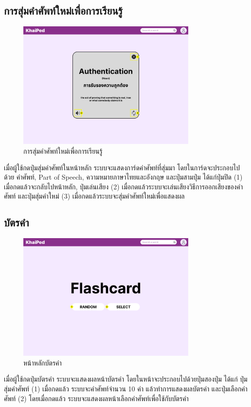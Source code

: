 \documentclass[12pt,oneside,openright,a4paper]{cpe-thai-project}
\begin{document}
\pagebreak
\subsection{การสุ่มคำศัพท์ใหม่เพื่อการเรียนรู้}
\begin{figure}[!h]\centering
	\includegraphics[width=0.8\textwidth, keepaspectratio=true]{image/chap3/ui/Random Word.png}
	\caption{การสุ่มคำศัพท์ใหม่เพื่อการเรียนรู้}\label{fig:UI_RandomWord}
\end{figure}
\hspace{1cm}
เมื่อผู้ใช้กดปุ่มสุ่มคำศัพท์ในหน้าหลัก ระบบจะแสดงการ์ดคำศัพท์ที่สุ่มมา โดยในการ์ดจะประกอบไปด้วย คำศัพท์, Part of Speech, ความหมายภาษาไทยและอังกฤษ และปุ่มสามปุ่ม ได้แก่ปุ่มปิด (1)
เมื่อกดแล้วจะกลับไปหน้าหลัก, ปุ่มเล่นเสียง (2) เมื่อกดแล้วระบบจะเล่นเสียงวิธีการออกเสียงของคำศัพท์ และปุ่มสุ่มคำใหม่ (3) เมื่อกดแล้วระบบจะสุ่มคำศัพท์ใหม่เพื่อแสดงผล

\pagebreak
\subsection{บัตรคำ}
\begin{figure}[!h]\centering
	\includegraphics[width=0.8\textwidth, keepaspectratio=true]{image/chap3/ui/flashcard/Flashcard.png}
	\caption{หน้าหลักบัตรคำ}\label{fig:UI_Flashcard}
\end{figure}
\hspace{1cm}
เมื่อผู้ใช้กดปุ่มบัตรคำ ระบบจะแสดงผลหน้าบัตรคำ โดยในหน้าจะประกอบไปด้วยปุ่มสองปุ่ม ได้แก่ ปุ่มสุ่มคำศัพท์ (1) เมื่อกดแล้ว ระบบจะคำศัพท์จำนวน 10 คำ
แล้วทำการแสดงผลบัตรคำ และปุ่มเลือกคำศัพท์ (2) โดยเมื่อกดแล้ว ระบบจะแสดงผลหน้าเลือกคำศัพท์เพื่อใช้กับบัตรคำ
\end{document}
